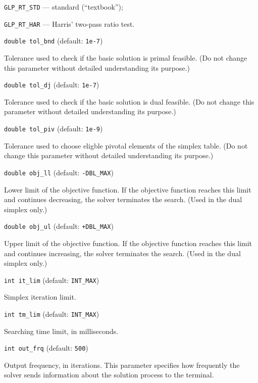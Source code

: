 \verb|GLP_RT_STD| --- standard (``textbook'');

\verb|GLP_RT_HAR| --- Harris' two-pass ratio test.

\bigskip

{\tt double tol\_bnd} (default: {\tt 1e-7})

Tolerance used to check if the basic solution is primal feasible.
(Do not change this parameter without detailed understanding its
purpose.)

\bigskip

{\tt double tol\_dj} (default: {\tt 1e-7})

Tolerance used to check if the basic solution is dual feasible.
(Do not change this parameter without detailed understanding its
purpose.)

\bigskip

{\tt double tol\_piv} (default: {\tt 1e-9})

Tolerance used to choose eligble pivotal elements of the simplex table.
(Do not change this parameter without detailed understanding its
purpose.)

\newpage

{\tt double obj\_ll} (default: {\tt -DBL\_MAX})

Lower limit of the objective function. If the objective function
reaches this limit and continues decreasing, the solver terminates the
search. (Used in the dual simplex only.)

\bigskip

{\tt double obj\_ul} (default: {\tt +DBL\_MAX})

Upper limit of the objective function. If the objective function
reaches this limit and continues increasing, the solver terminates the
search. (Used in the dual simplex only.)

\bigskip

{\tt int it\_lim} (default: {\tt INT\_MAX})

Simplex iteration limit.

\bigskip

{\tt int tm\_lim} (default: {\tt INT\_MAX})

Searching time limit, in milliseconds.

\bigskip

{\tt int out\_frq} (default: {\tt 500})

Output frequency, in iterations. This parameter specifies how
frequently the solver sends information about the solution process to
the terminal.

